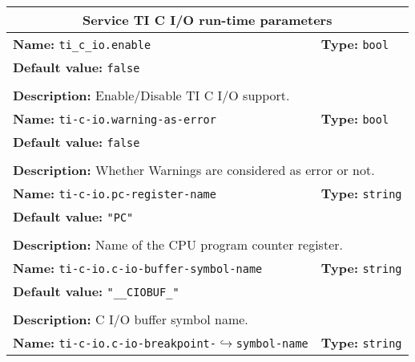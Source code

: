 \newpage
\begin{center}
	\begin{tabular}{|p{7.5cm}|p{7.5cm}|}
	\hline
	\multicolumn{2}{|c|}{\textbf{\large Service TI C I/O run-time parameters}}\\
	\hline
	\multicolumn{1}{|p{7.5cm}}{\textbf{Name:} \texttt{ti\_c\_io.enable}} & \multicolumn{1}{p{7.5cm}|}{\textbf{Type:} \texttt{bool}}\\
	\multicolumn{2}{|p{15cm}|}{\textbf{Default value:} \texttt{false}}\\
	\multicolumn{2}{|l|}{}\\
	\multicolumn{2}{|p{15cm}|}{\textbf{Description:} \newline Enable/Disable TI C I/O support.}\\
	\hline
	\multicolumn{1}{|p{7.5cm}}{\textbf{Name:} \texttt{ti-c-io.warning-as-error}} & \multicolumn{1}{p{7.5cm}|}{\textbf{Type:} \texttt{bool}}\\
	\multicolumn{2}{|p{15cm}|}{\textbf{Default value:} \texttt{false}}\\
	\multicolumn{2}{|l|}{}\\
	\multicolumn{2}{|p{15cm}|}{\textbf{Description:} \newline Whether Warnings are considered as error or not.}\\
	\hline
	\multicolumn{1}{|p{7.5cm}}{\textbf{Name:} \texttt{ti-c-io.pc-register-name}} & \multicolumn{1}{p{7.5cm}|}{\textbf{Type:} \texttt{string}}\\
	\multicolumn{2}{|p{15cm}|}{\textbf{Default value:} \texttt{"PC"}}\\
	\multicolumn{2}{|l|}{}\\
	\multicolumn{2}{|p{15cm}|}{\textbf{Description:} \newline Name of the CPU program counter register.}\\
	\hline
	\multicolumn{1}{|p{7.5cm}}{\textbf{Name:} \texttt{ti-c-io.c-io-buffer-symbol-name}} & \multicolumn{1}{p{7.5cm}|}{\textbf{Type:} \texttt{string}}\\
	\multicolumn{2}{|p{15cm}|}{\textbf{Default value:} \texttt{"\_\_CIOBUF\_"}}\\
	\multicolumn{2}{|l|}{}\\
	\multicolumn{2}{|p{15cm}|}{\textbf{Description:} \newline C I/O buffer symbol name.}\\
	\hline
	\multicolumn{1}{|p{7.5cm}}{\textbf{Name:} \texttt{ti-c-io.c-io-breakpoint-}\newline$\hookrightarrow$\texttt{symbol-name}} & \multicolumn{1}{p{7.5cm}|}{\textbf{Type:} \texttt{string}}\\

\end{tabular}
\end{center}
